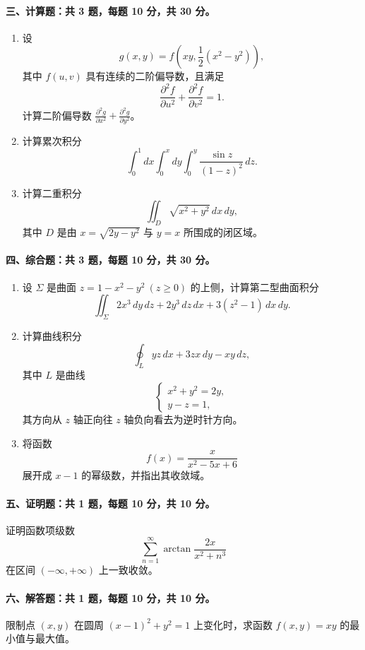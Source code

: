 \paragraph*{三、计算题：共 3 题，每题 10 分，共 30 分。}
\begin{enumerate}
  \item 设
  \[
    g(x,y)=f\left(xy,\frac12(x^2-y^2)\right),
  \]
  其中 $f(u,v)$ 具有连续的二阶偏导数，且满足
  \[
    \frac{\partial^2 f}{\partial u^2}+\frac{\partial^2 f}{\partial v^2}=1.
  \]
  计算二阶偏导数 $\displaystyle \frac{\partial^2 g}{\partial x^2}+\frac{\partial^2 g}{\partial y^2}$。
  \item 计算累次积分
  \[
    \int_0^1 dx\int_0^x dy\int_0^y \frac{\sin z}{(1-z)^2}\,dz.
  \]
  \item 计算二重积分
  \[
    \iint_D \sqrt{x^2+y^2}\,dx\,dy,
  \]
  其中 $D$ 是由 $x=\sqrt{2y-y^2}$ 与 $y=x$ 所围成的闭区域。
\end{enumerate}

\paragraph*{四、综合题：共 3 题，每题 10 分，共 30 分。}
\begin{enumerate}
  \item 设 $\Sigma$ 是曲面 $z=1-x^2-y^2\ (z\ge 0)$ 的上侧，计算第二型曲面积分
  \[
    \iint_\Sigma 2x^3\,dy\,dz+2y^3\,dz\,dx+3(z^2-1)\,dx\,dy.
  \]
  \item 计算曲线积分
  \[
    \oint_L yz\,dx+3zx\,dy-xy\,dz,
  \]
  其中 $L$ 是曲线
  \[
    \begin{cases}
      x^2+y^2=2y,\\
      y-z=1,
    \end{cases}
  \]
  其方向从 $z$ 轴正向往 $z$ 轴负向看去为逆时针方向。
  \item 将函数
  \[
    f(x)=\frac{x}{x^2-5x+6}
  \]
  展开成 $x-1$ 的幂级数，并指出其收敛域。
\end{enumerate}

\paragraph*{五、证明题：共 1 题，每题 10 分，共 10 分。}
证明函数项级数
\[
  \sum_{n=1}^{\infty}\arctan\frac{2x}{x^2+n^3}
\]
在区间 $(-\infty,+\infty)$ 上一致收敛。

\paragraph*{六、解答题：共 1 题，每题 10 分，共 10 分。}
限制点 $(x,y)$ 在圆周 $(x-1)^2+y^2=1$ 上变化时，求函数 $f(x,y)=xy$ 的最小值与最大值。

